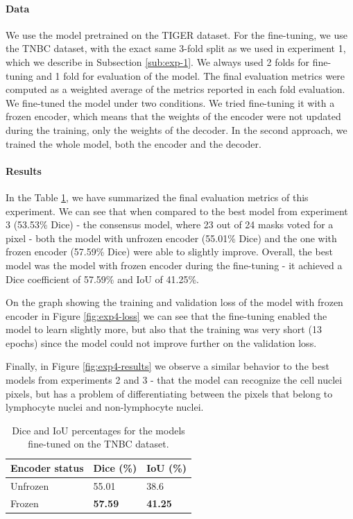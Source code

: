 \paragraph{Data}
We use the model pretrained on the TIGER dataset. For the fine-tuning, we use the TNBC dataset, with the exact same 3-fold split as we used in experiment 1, which we describe in Subsection \ref{sub:exp-1}. We always used 2 folds for fine-tuning and 1 fold for evaluation of the model. The final evaluation metrics were computed as a weighted average of the metrics reported in each fold evaluation. We fine-tuned the model under two conditions. We tried fine-tuning it with a frozen encoder, which means that the weights of the encoder were not updated during the training, only the weights of the decoder. In the second approach, we trained the whole model, both the encoder and the decoder.

\paragraph{Results}
In the Table \ref{tab:transfer}, we have summarized the final evaluation metrics of this experiment. We can see that when compared to the best model from experiment 3 (53.53\% Dice) - the consensus model, where 23 out of 24 masks voted for a pixel - both the model with unfrozen encoder (55.01\% Dice) and the one with frozen encoder (57.59\% Dice) were able to slightly improve. Overall, the best model was the model with frozen encoder during the fine-tuning - it achieved a Dice coefficient of 57.59\% and IoU of 41.25\%.

On the graph showing the training and validation loss of the model with frozen encoder in Figure \ref{fig:exp4-loss} we can see that the fine-tuning enabled the model to learn slightly more, but also that the training was very short (13 epochs) since the model could not improve further on the validation loss.

Finally, in Figure \ref{fig:exp4-results} we observe a similar behavior to the best models from experiments 2 and 3 - that the model can recognize the cell nuclei pixels, but has a problem of differentiating between the pixels that belong to lymphocyte nuclei and non-lymphocyte nuclei.

\begin{table}[H]
  \centering
  \caption{Dice and IoU percentages for the models fine-tuned on the TNBC dataset.}
  \begin{tabular}{ p{5cm} | p{3cm} | p{3cm} } 
    \hline
    \textbf{Encoder status} & \textbf{Dice (\%)} & \textbf{IoU (\%)} \\
    \hline
      Unfrozen & 55.01 & 38.6 \\
      Frozen   & \textbf{57.59} & \textbf{41.25} \\
    \hline
  \end{tabular}
  \label{tab:transfer}
\end{table}

